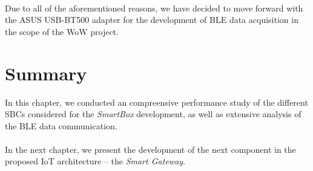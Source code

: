 \paragraph{} Due to all of the aforementioned reasons, we have decided to move forward with the ASUS USB-BT500 adapter for the development of \acs{BLE} data acquisition in the scope of the \acs{WoW} project.

\section{Summary}
In this chapter, we conducted an compreensive performance study of the different \acs{SBC}s considered for the \textit{SmartBox} development, as well as extensive analysis of the \acs{BLE} data communication.

\paragraph{} In the next chapter, we present the development of the next component in the proposed \acs{IoT} architecture -- the \textit{Smart Gateway}.